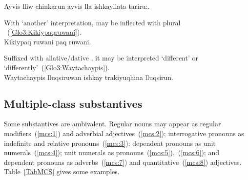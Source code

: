 %
{Ayvis lliw chinkarun ayvis lla ishkayllata tariru:.}%
{}%
{}{}%

\noindent
With ‘another’ interpretation,  may be inflected with plural ~(\ref{Glo3:Kikiypaqruwani}).\\

%
{Kikiypaq ruwani paq ruwani.}%
{}%
{}{}%

\noindent
Suffixed with allative/dative , it may be interpreted ‘different’ or ‘differently’~(\ref{Glo3:Waytachaypis}).\\

%
{Waytachaypis  lluqsiruwan ishkay trakiyuqhina lluqsirun.}%
{}%
{}{}%

\subsection{Multiple-class substantives}\label{sec:mcsub}
Some substantives are ambivalent. Regular nouns may appear as regular modifiers~(\ref{mcs:1}) and adverbial adjectives~(\ref{mcs:2}); interrogative pronouns as indefinite and relative pronouns~(\ref{mcs:3}); dependent pronouns as unit numerals~(\ref{mcs:4}); unit numerals as pronouns~(\ref{mcs:5}),~(\ref{mcs:6}); and dependent pronouns as adverbs~(\ref{mcs:7}) and quantitative~(\ref{mcs:8}) adjectives. Table~\ref{TabMCS} gives some examples.


